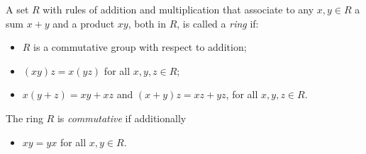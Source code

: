 A set $R$ with rules of addition and multiplication that associate to any $x, y \in R$ a sum $x+y$ and a product $xy$, both in $R$, is called a \emph{ring} if:
\begin{itemize}
\item[R.1.] $R$ is a commutative group with respect to addition;
\item[R.2.] $(xy)z = x(yz)$ for all $x, y, z \in R$;
\item[R.3.] $x(y+z) = xy + xz$ and $(x+y)z = xz + yz$, for all $x, y, z \in R$.
\end{itemize}
The ring $R$ is \emph{commutative} if additionally
\begin{itemize}
\item[R.4.] $xy = yx$ for all $x, y \in R$.
\end{itemize}
